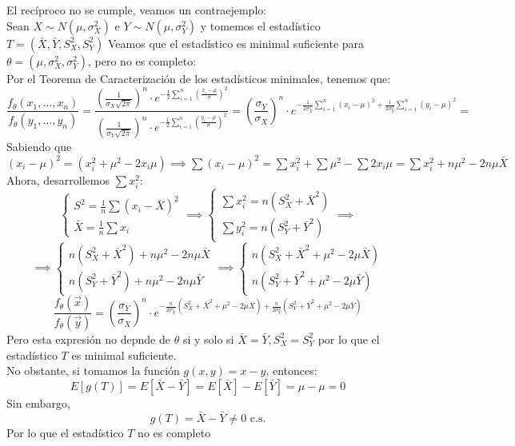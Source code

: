\begin{observación}
	El recíproco no se cumple, veamos un contraejemplo:\\
	Sean $X \sim N(\mu, \sigma_{X}^2)$ e $Y \sim N(\mu, \sigma_{Y}^2)$ y tomemos el estadístico $T = (\bar{X}, \bar{Y}, S_X^2, S_Y^2)$
	Veamos que el estadístico es minimal suficiente  para $\theta = (\mu, \sigma_X^2,\sigma_Y^2)$, pero no es completo: \\
	Por el Teorema de Caracterización de los estadísticos minimales, tenemos que: 
	$$\frac{f_{\theta}(x_1, \ldots, x_n)}{f_{\theta}(y_1, \ldots, y_n)} = \frac{\left(\frac{1}{\sigma_X\sqrt{2\pi}}\right)^n \cdot e^{-\frac{1}{2}\sum_{i = 1}^{n}(\frac{x_i - \mu}{\sigma})^2}}{\left(\frac{1}{\sigma_Y\sqrt{2\pi}}\right)^n \cdot e^{-\frac{1}{2}\sum_{i = 1}^{n}(\frac{y_i - \mu}{\sigma})^2}} =  \left(\frac{\sigma_Y}{\sigma_X}\right)^n \cdot e^{-\frac{1}{2\sigma_X^2}\sum_{i = 1}^{n}(x_i - \mu)^2 + \frac{1}{2\sigma_Y^2}\sum_{i = 1}^{n}(y_i - \mu)^2} = $$
	Sabiendo que $(x_i - \mu)^2 = (x_i^2 + \mu^2 - 2x_i\mu) \implies \sum(x_i - \mu)^2 = \sum x_i^2 + \sum \mu^2 -\sum 2x_i \mu = \sum x_i^2 + n\mu^2 - 2n\mu\bar{X}$\\
	Ahora, desarrollemos $\sum x_i^2$:\\
	$$\begin{cases} S^2 = \frac{1}{n}\sum(x_i - \bar{X})^2 \\ \bar{X} = \frac{1}{n}\sum x_i \end{cases} \implies \begin{cases} \sum x_i^2 = n(S_X^2 + \bar{X}^2) \\ \sum y_i^2 = n(S_Y^2 + \bar{Y}^2) \end{cases} \implies$$ $$ \implies \begin{cases} n(S_X^2 + \bar{X}^2) + n\mu^2 - 2n\mu \bar{X} \\ n(S_Y^2 + \bar{Y}^2) + n\mu^2 - 2n\mu\bar{Y} \end{cases} \implies \begin{cases} n(S_X^2 + \bar{X}^2 + \mu^2 - 2\mu\bar{X}) \\ n(S_Y^2 + \bar{Y}^2 + \mu^2 - 2\mu\bar{Y}) \end{cases} $$
	$$ \frac{f_{\theta}(\vec{x})}{f_{\theta}(\vec{y})} = \left(\frac{\sigma_Y}{\sigma_X}\right)^n \cdot e^ {-\frac{n}{2\sigma_X^2}(S_X^2 + \bar{X}^2 + \mu^2 - 2\mu\bar{X}) + \frac{n}{2\sigma_Y^2}(S_Y^2 + \bar{Y}^2 + \mu^2 - 2\mu\bar{Y})}$$
	Pero esta expresión no depnde de $\theta$ si y solo si $\bar{X} = \bar{Y}, S_X^2 = S_Y^2$ por lo que el estadístico $T$ es minimal suficiente.\\
	No obstante, si tomamos la función $g(x, y) = x - y$, entonces:
	$$E[g(T)] = E[\bar{X} - \bar{Y}] = E[\bar{X}] - E[\bar{Y}] = \mu - \mu = 0$$
	Sin embargo, 
	$$g(T) = \bar{X} - \bar{Y} \neq 0 \text{ c.s.}$$
	Por lo que el estadístico $T$ no es completo
\end{observación}
  

